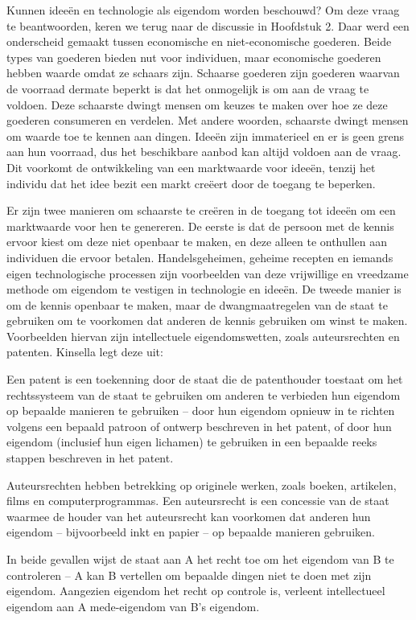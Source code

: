 Kunnen ideeën en technologie als eigendom worden beschouwd? Om deze vraag te beantwoorden, keren we terug naar de discussie in Hoofdstuk 2. Daar werd een onderscheid gemaakt tussen economische en niet-economische goederen. Beide types van goederen bieden nut voor individuen, maar economische goederen hebben waarde omdat ze schaars zijn. Schaarse goederen zijn goederen waarvan de voorraad dermate beperkt is dat het onmogelijk is om aan de vraag te voldoen. Deze schaarste dwingt mensen om keuzes te maken over hoe ze deze goederen consumeren en verdelen. Met andere woorden, schaarste dwingt mensen om waarde toe te kennen aan dingen. Ideeën zijn immaterieel en er is geen grens aan hun voorraad, dus het beschikbare aanbod kan altijd voldoen aan de vraag. Dit voorkomt de ontwikkeling van een marktwaarde voor ideeën, tenzij het individu dat het idee bezit een markt creëert door de toegang te beperken.

Er zijn twee manieren om schaarste te creëren in de toegang tot ideeën om een marktwaarde voor hen te genereren. De eerste is dat de persoon met de kennis ervoor kiest om deze niet openbaar te maken, en deze alleen te onthullen aan individuen die ervoor betalen. Handelsgeheimen, geheime recepten en iemands eigen technologische processen zijn voorbeelden van deze vrijwillige en vreedzame methode om eigendom te vestigen in technologie en ideeën. De tweede manier is om de kennis openbaar te maken, maar de dwangmaatregelen van de staat te gebruiken om te voorkomen dat anderen de kennis gebruiken om winst te maken. Voorbeelden hiervan zijn intellectuele eigendomswetten, zoals auteursrechten en patenten. Kinsella legt deze uit:

\begin{blockquotebox}
    Een patent is een toekenning door de staat die de patenthouder toestaat om het rechtssysteem van de staat te gebruiken om anderen te verbieden hun eigendom op bepaalde manieren te gebruiken -- door hun eigendom opnieuw in te richten volgens een bepaald patroon of ontwerp beschreven in het patent, of door hun eigendom (inclusief hun eigen lichamen) te gebruiken in een bepaalde reeks stappen beschreven in het patent.
    \par\vspace{1em}\noindent
    Auteursrechten hebben betrekking op \textquotesingle originele werken\textquotesingle, zoals boeken, artikelen, films en computerprogramma\textquotesingle s. Een auteursrecht is een concessie van de staat waarmee de houder van het auteursrecht kan voorkomen dat anderen hun eigendom -- bijvoorbeeld inkt en papier -- op bepaalde manieren gebruiken.
    \par\vspace{1em}\noindent
    In beide gevallen wijst de staat aan A het recht toe om het eigendom van B te controleren -- A kan B vertellen om bepaalde dingen niet te doen met zijn eigendom. Aangezien eigendom het recht op controle is, verleent intellectueel eigendom aan A mede-eigendom van B's eigendom.\footnotemark
\end{blockquotebox}
\autocite{84}

